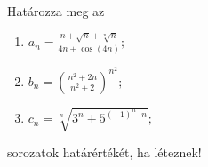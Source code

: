 \documentclass[11pt]{scrartcl}
\begin{document}
Határozza meg az
\begin{enumerate}
	\item \(\displaystyle
	      a_n = \frac{n + \sqrt{n} + \sqrt[n]{n}}{4n + \cos(4n)};
	      \)

	\item \(\displaystyle
	      b_n = \left(
	      \frac{n^2 + 2n}{n^2 + 2}
	      \right)^{n^2};
	      \)

	\item \(\displaystyle
	      c_n = \sqrt[n]{3^n + 5^{(-1)^n \cdot n}};
	      \)
\end{enumerate}
sorozatok határértékét, ha léteznek!
\end{document}
